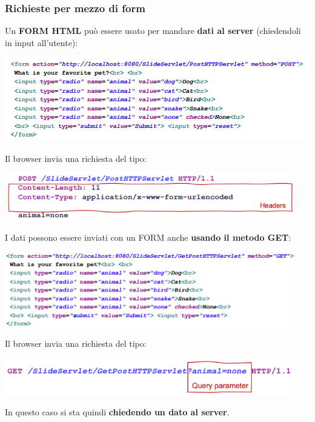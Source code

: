 \documentclass[12pt]{article}
\begin{document}
\subsubsection{Richieste per mezzo di form}
Un \textbf{FORM HTML} può essere usato per mandare \textbf{dati al server} (chiedendoli in input all'utente):
\begin{center}
    \includegraphics[width = 1\textwidth]{Images/180.png}
\end{center}
Il browser invia una richiesta del tipo:
\begin{center}
    \includegraphics[width = 0.95\textwidth]{Images/181.png}
\end{center}
I dati possono essere inviati con un FORM anche \textbf{usando il metodo GET}:
\begin{center}
    \includegraphics[width = 0.95\textwidth]{Images/182.png}
\end{center}
Il browser invia una richiesta del tipo:
\begin{center}
    \includegraphics[width = 0.95\textwidth]{Images/183.png}
\end{center}
In questo caso si sta quindi \textbf{chiedendo un dato al server}.
\end{document}
